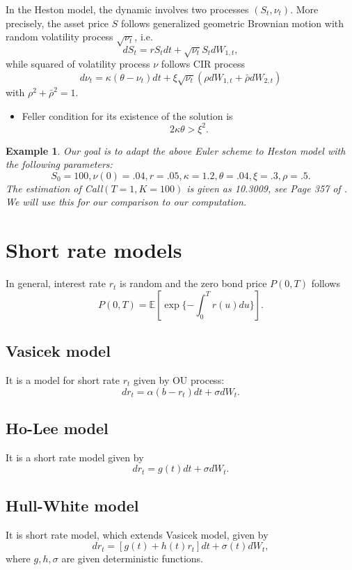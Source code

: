\documentclass{article}
\newtheorem{example}{Example}
\begin{document}
In the Heston model, the dynamic involves two processes $(S_{t}, \nu_{t})$.
More precisely, the asset price $S$ follows generalized geometric Brownian motion with random volatility process $\sqrt{\nu_{t}}$, i.e.  
$$d S_{t} = r S_{t} dt + \sqrt{\nu_{t}} S_{t} dW_{1,t},$$
while squared of volatility process $\nu$ follows CIR process
$$ d \nu_{t} = \kappa (\theta - \nu_{t}) dt + \xi \sqrt{\nu_{t}} (\rho dW_{1,t} + 
\bar \rho d W_{2,t})$$
with $\rho^{2} + \bar \rho^{2} = 1.$ 

\begin{itemize}
\item
Feller condition for its existence of the solution is
$$2\kappa \theta > \xi^{2}.$$
\end{itemize}


\begin{example}
\label{exm:heston01}
Our goal is to adapt the above Euler scheme to Heston model with the following parameters:
$$ S_{0} = 100, \nu(0) = .04, r = .05, \kappa = 1.2, 
\theta = .04, \xi = .3, \rho = .5.$$
The estimation of Call$(T =1, K = 100)$ is given as 10.3009, see Page 357 of \cite{Gla04}. We will use this for our comparison to our computation.
\end{example}



\section{Short rate models}

In general, interest rate $r_{t}$ is random and 
the zero bond price $P(0, T)$ follows
$$P(0, T) = \mathbb E[ \exp\{- \int_0^T r(u) du\} ].$$

\subsection{Vasicek model}
It is a model for short rate $r_t$ given by OU process:
$$d r_t = \alpha(b - r_t) dt + \sigma dW_t.$$

\subsection{Ho-Lee model}
It is a short rate model given by
$$d r_t = g(t) dt + \sigma dW_t.$$

\subsection{Hull-White model}
It is short rate model, which extends Vasicek model, given by
$$dr_t = [g(t) + h(t) r_t] dt + \sigma(t) dW_t,$$
where $g, h, \sigma$ are given deterministic functions.
\end{document}
